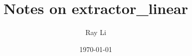 \documentclass[12pt]{article}
\begin{document}
\title{Notes on extractor_linear}
\author{Ray Li}
\date{\today}
\maketitle

\tableofcontents





\end{document}
